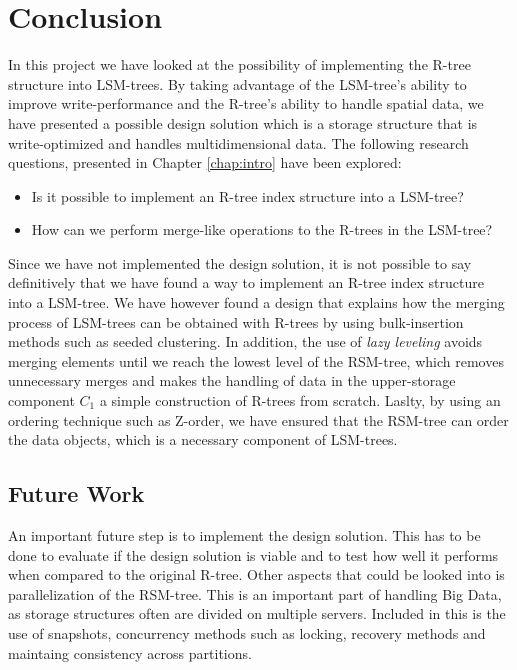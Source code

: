 \chapter{Conclusion}
In this project we have looked at the possibility of implementing the R-tree structure into LSM-trees. By taking advantage of the LSM-tree's ability to improve write-performance and the R-tree's ability to handle spatial data, we have presented a possible design solution which is a storage structure that is write-optimized and handles multidimensional data. The following research questions, presented in Chapter \ref{chap:intro} have been explored: 

\begin{itemize}
    \item Is it possible to implement an R-tree index structure into a LSM-tree?
    \item How can we perform merge-like operations to the R-trees in the LSM-tree?
\end{itemize}\newline

\noindent
Since we have not implemented the design solution, it is not possible to say definitively that we have found a way to implement an R-tree index structure into a LSM-tree. We have however found a design that explains how the merging process of LSM-trees can be obtained with R-trees by using bulk-insertion methods such as seeded clustering. In addition, the use of \emph{lazy leveling} avoids merging elements until we reach the lowest level of the RSM-tree, which removes unnecessary merges and makes the handling of data in the upper-storage component $C_1$ a simple construction of R-trees from scratch. Laslty, by using an ordering technique such as Z-order, we have ensured that the RSM-tree can order the data objects, which is a necessary component of LSM-trees.  


\section{Future Work}
An important future step is to implement the design solution. This has to be done to evaluate if the design solution is viable and to test how well it performs when compared to the original R-tree. Other aspects that could be looked into is parallelization of the RSM-tree. This is an important part of handling Big Data, as storage structures often are divided on multiple servers. Included in this is the use of snapshots, concurrency methods such as locking, recovery methods and maintaing consistency across partitions. 

